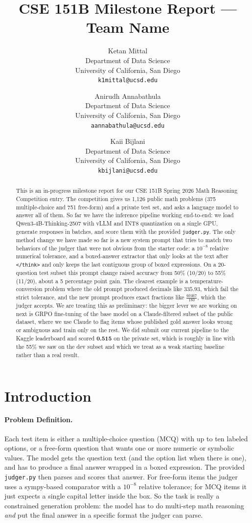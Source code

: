 \documentclass{article}
\title{
CSE 151B Milestone Report --- Team Name
\\
}
\author{%
  Ketan Mittal \\
  Department of Data Science \\
  University of California, San Diego \\
  \texttt{k1mittal@ucsd.edu} %
  \and
  Anirudh Annabathula \\
  Department of Data Science \\
  University of California, San Diego \\
  \texttt{aannabathula@ucsd.edu} %
  \and
  Kaii Bijlani \\
  Department of Data Science \\
  University of California, San Diego \\
  \texttt{kbijlani@ucsd.edu} %
}
\begin{document}
\maketitle


\begin{abstract}
This is an in-progress milestone report for our CSE 151B Spring
2026 Math Reasoning Competition entry. The competition gives us 1{,}126
public math problems (375 multiple-choice and 751 free-form) and a
private test set, and asks a language model to answer all of them. So
far we have the inference pipeline working end-to-end: we load
Qwen3-4B-Thinking-2507 with vLLM and INT8 quantization on a single GPU,
generate responses in batches, and score them with the provided
\texttt{judger.py}. The only method change we have made so far is a
new system prompt that tries to match two behaviors of the judger
that were not obvious from the starter code: a $10^{-8}$ relative
numerical tolerance, and a boxed-answer extractor that only
looks at the text after \texttt{</think>} and only keeps the last
contiguous group of boxed expressions. On a 20-question test subset
this prompt change raised accuracy from 50\% (10/20) to 55\%
(11/20), about a 5 percentage point gain. The clearest example is a
temperature-conversion problem where the old prompt produced
decimals like $335.93$, which fail the strict tolerance, and the
new prompt produces exact fractions like $\tfrac{60467}{180}$,
which the judger accepts. We are treating this as preliminary: the
bigger lever we are working on next is GRPO fine-tuning of the base
model on a Claude-filtered subset of the public dataset, where we
use Claude to flag items whose published gold answer looks wrong or
ambiguous and train only on the rest. We did submit our current
pipeline to the Kaggle leaderboard and scored \textbf{0.515} on the
private set, which is roughly in line with the 55\% we saw on the
dev subset and which we treat as a weak starting baseline rather
than a real result.
\end{abstract}


\section{Introduction}
\label{sec:intro}

\paragraph{Problem Definition.}
Each test item is either a multiple-choice question (MCQ) with up to
ten labeled options, or a free-form question that wants one or more
numeric or symbolic values. The model gets the question text (and the
option list when there is one), and has to produce a final answer
wrapped in a boxed expression. The provided \texttt{judger.py} then
parses and scores that answer. For free-form items the judger uses a
sympy-based comparator with a $10^{-8}$ relative tolerance; for MCQ
items it just expects a single capital letter inside the box. So the
task is really a constrained generation problem: the model has to do
multi-step math reasoning \emph{and} put the final answer in a
specific format the judger can parse.
\end{document}
